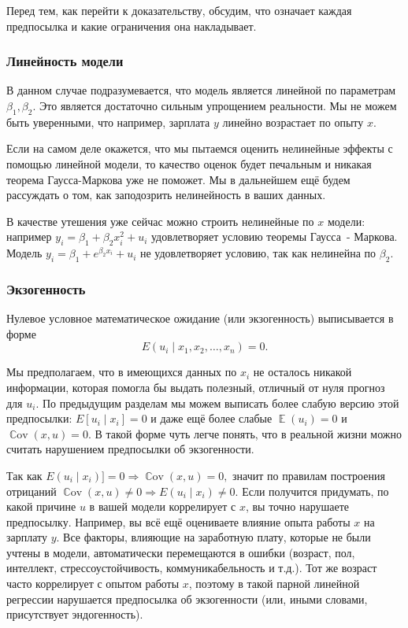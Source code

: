 \documentclass[12pt]{article}
\DeclareMathOperator{\Cov}{\mathbb{C}ov}
\DeclareMathOperator{\E}{\mathbb{E}}
\begin{document}

Перед тем, как перейти к доказательству, обсудим, что означает каждая предпосылка и какие ограничения она накладывает.

\subsubsection*{Линейность модели}

В данном случае подразумевается, что модель является линейной по параметрам $\beta_1, \beta_2$. Это является достаточно сильным упрощением реальности. Мы не можем быть уверенными, что например, зарплата $y$ линейно возрастает по опыту $x$. 

Если на самом деле окажется, что мы пытаемся оценить нелинейные эффекты с помощью линейной модели, то качество оценок будет печальным и никакая теорема Гаусса-Маркова уже не поможет. Мы в дальнейшем ещё будем рассуждать о том, как заподозрить нелинейность в ваших данных.

В качестве утешения уже сейчас можно строить нелинейные по $x$ модели: например \( y_i = \beta_1 + \beta_2 x_i^2 + u_i \) удовлетворяет условию теоремы Гаусса~- Маркова. Модель \( y_i = \beta_1 + e^{\beta_2 x_i} + u_i \) не удовлетворяет условию, так как нелинейна по $\beta_2$. 

\subsubsection*{Экзогенность}
Нулевое условное математическое ожидание (или экзогенность) выписывается в форме \[ E(u_i \mid x_1, x_2, \dots, x_n) = 0. \]


Мы предполагаем, что в имеющихся данных по $x_i$ не осталось никакой информации, которая помогла бы выдать полезный, отличный от нуля прогноз для $u_i$. По предыдущим разделам мы можем выписать более слабую версию этой предпосылки: \( E[u_i \mid x_i] = 0 \) и даже ещё более слабые $\E(u_i) = 0$ и $\Cov(x, u) = 0.$ В такой форме чуть легче понять, что в реальной жизни можно считать нарушением предпосылки об экзогенности. 

Так как \( E(u_i \mid x_i)] = 0 \Rightarrow \Cov{(x, u)} = 0,  \) значит по правилам построения отрицаний \(\Cov(x, u) \neq 0  \Rightarrow E(u_i \mid x_i) \neq 0.\) Если получится придумать, по какой причине $u$ в вашей модели коррелирует с $x$, вы точно нарушаете предпосылку. Например, вы всё ещё оцениваете влияние опыта работы $x$ на зарплату $y$. Все факторы, влияющие на заработную плату, которые не были учтены в модели, автоматически перемещаются в ошибки (возраст, пол, интеллект, стрессоустойчивость, коммуникабельность и т.д.). Тот же возраст часто коррелирует с опытом работы $x$, поэтому в такой парной линейной регрессии нарушается предпосылка об экзогенности (или, иными словами, присутствует эндогенность).
\end{document}

